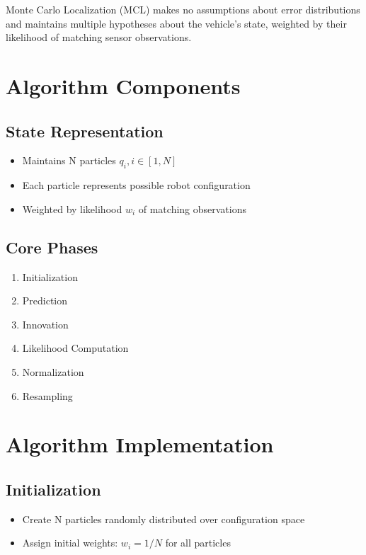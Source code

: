 \documentclass[openany]{book}
\theoremstyle{definition}
\theoremstyle{remark}
\newcommand{\definitionbox}[1]{
\begin{tcolorbox}[colback=blue!5,colframe=blue!40!black,title=Definition]
 #1
\end{tcolorbox}
}
\begin{document}
\definitionbox{Monte Carlo Localization (MCL) makes no assumptions about error distributions and maintains multiple hypotheses about the vehicle's state, weighted by their likelihood of matching sensor observations.}

\section{Algorithm Components}

\subsection{State Representation}
\begin{itemize}
   \item Maintains N particles $q_i, i \in [1,N]$
   \item Each particle represents possible robot configuration
   \item Weighted by likelihood $w_i$ of matching observations
\end{itemize}

\subsection{Core Phases}
\begin{enumerate}
   \item Initialization
   \item Prediction
   \item Innovation
   \item Likelihood Computation
   \item Normalization
   \item Resampling
\end{enumerate}

\section{Algorithm Implementation}

\subsection{Initialization}
\begin{itemize}
   \item Create N particles randomly distributed over configuration space
   \item Assign initial weights: $w_i = 1/N$ for all particles
\end{itemize}
\end{document}
